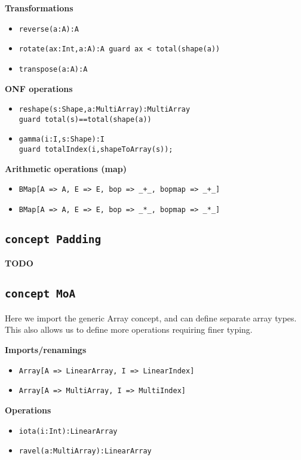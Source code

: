 \documentclass{article}
\begin{document}
\noindent \textbf{Transformations}
\begin{itemize}
    \item \texttt{reverse(a:A):A}
    \item \texttt{rotate(ax:Int,a:A):A guard ax < total(shape(a))}
    \item \texttt{transpose(a:A):A}
\end{itemize}

\noindent \textbf{ONF operations}
\begin{itemize}
    \item \texttt{reshape(s:Shape,a:MultiArray):MultiArray \\ guard total(s)==total(shape(a))}
    \item \texttt{gamma(i:I,s:Shape):I \\ guard totalIndex(i,shapeToArray(s));}
\end{itemize}


\noindent \textbf{Arithmetic operations (map)}
\begin{itemize}
    \item \texttt{BMap[A => A, E => E, bop => \_+\_, bopmap => \_+\_]}
    \item \texttt{BMap[A => A, E => E, bop => \_*\_, bopmap => \_*\_]}
\end{itemize}
\subsection{\texttt{concept Padding}}
\noindent \textbf{TODO}
\subsection{\texttt{concept MoA}}
\noindent Here we import the generic Array concept, and can define separate array types. This also allows us to define more operations requiring finer typing.

\noindent \textbf{Imports/renamings}
\begin{itemize}
    \item \texttt{Array[A => LinearArray, I => LinearIndex]}
    \item \texttt{Array[A => MultiArray, I => MultiIndex]}
\end{itemize}

\noindent \textbf{Operations}
\begin{itemize}
    \item \texttt{iota(i:Int):LinearArray}
    \item \texttt{ravel(a:MultiArray):LinearArray}
\end{itemize}
\end{document}
